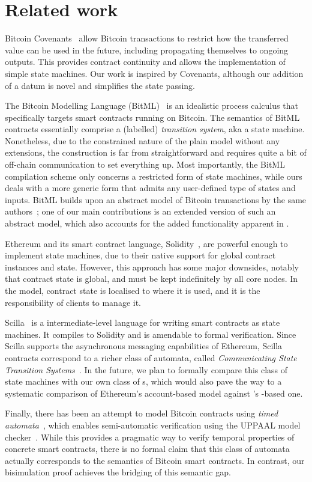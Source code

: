 \section{Related work}
\label{sec:related}

Bitcoin Covenants~\cite{moser2016bitcoin} allow Bitcoin transactions
to restrict how the transferred value can be used in the future,
including propagating themselves to ongoing outputs. This provides
contract continuity and allows the implementation of simple state
machines. Our work is inspired by Covenants, although our addition of
a datum is novel and simplifies the state passing.

The Bitcoin Modelling Language (BitML)~\cite{bitml} is an idealistic process calculus
that specifically targets smart contracts running on Bitcoin.
The semantics of BitML contracts essentially comprise a (labelled) \textit{transition system}, aka a state machine.
Nonetheless, due to the constrained nature of the plain \UTXO{} model without any extensions,
the construction is far from straightforward and requires quite a bit of off-chain communication to set everything up.
Most importantly, the BitML compilation scheme only concerns a restricted form of state machines,
while ours deals with a more generic form that admits any user-defined type of states and inputs.
BitML builds upon an abstract model of Bitcoin transactions by the same
authors~\cite{formal-model-of-bitcoin-transactions};
one of our main contributions is an extended version of such an abstract model,
which also accounts for the added functionality apparent in \Cardano{}.

Ethereum and its smart contract language, Solidity~\cite{Solidity}, are powerful
enough to implement state machines, due to their native support for
global contract instances and state. However, this approach has some major downsides,
notably that contract state is global, and must be kept indefinitely by all core nodes.
In the \EUTXO{} model, contract state is localised to where it is used, and
it is the responsibility of clients to manage it.

Scilla~\cite{scilla} is a intermediate-level language for writing smart
contracts as state machines. It compiles to Solidity and is amendable to formal verification.
Since Scilla supports the asynchronous messaging capabilities of Ethereum,
Scilla contracts correspond to a richer class of automata, called
\textit{Communicating State Transition Systems}~\cite{csta}.
In the future, we plan to formally compare this class of state machines with our own class of \CEM{}s,
which would also pave the way to a systematic comparison of Ethereum's account-based model against \Cardano{}'s \UTXO{}-based one.

Finally, there has been an attempt to model Bitcoin contracts using \textit{timed automata}~\cite{timed-btc},
which enables semi-automatic verification using the UPPAAL model checker~\cite{uppaal}.
While this provides a pragmatic way to verify temporal properties of concrete smart contracts,
there is no formal claim that this class of automata actually corresponds to the semantics of Bitcoin smart contracts.
In contrast, our bisimulation proof achieves the bridging of this semantic gap.
